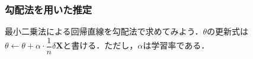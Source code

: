\subsubsection{勾配法を用いた推定}
最小二乗法による回帰直線を勾配法で求めてみよう．$\theta$の更新式は$\theta \leftarrow \theta + \alpha\cdot \dfrac{1}{n} \delta \mathbf{X}$と書ける．ただし，$\alpha$は学習率である．
